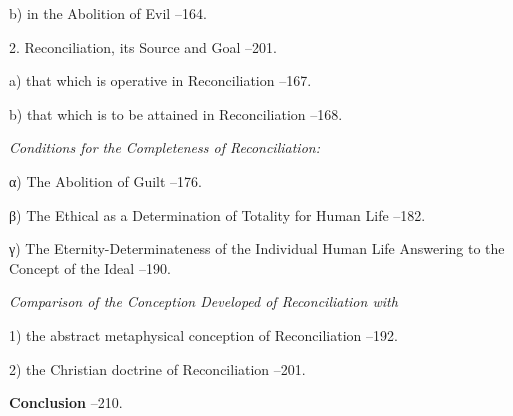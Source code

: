 \documentclass[12pt,a4paper]{book}
\begin{document}
\begin{list}{}{%
  \setlength{\leftmargin}{2.2em}\setlength{\itemindent}{-2.2em}%
  \setlength{\itemsep}{2pt}\setlength{\parsep}{0pt}}
\item[] \hspace{2.4em} b) in the Abolition of Evil --164.
\item[] \hspace{1.2em} 2. Reconciliation, its Source and Goal --201.
\item[] \hspace{2.4em} a) that which is operative in Reconciliation --167.
\item[] \hspace{2.4em} b) that which is to be attained in Reconciliation --168.
\item[] \hspace{2.4em} \emph{Conditions for the Completeness of Reconciliation:}
\item[] \hspace{2.4em} α) The Abolition of Guilt --176.
\item[] \hspace{2.4em} β) The Ethical as a Determination of Totality for
  Human Life --182.
\item[] \hspace{2.4em} γ) The Eternity-Determinateness of the Individual
  Human Life Answering to the Concept of the Ideal --190.
\item[] \hspace{1.2em} \emph{Comparison of the Conception Developed of
  Reconciliation with}
\item[] \hspace{1.2em} 1) the abstract metaphysical conception of
  Reconciliation --192.
\item[] \hspace{1.2em} 2) the Christian doctrine of Reconciliation --201.

\item \textbf{Conclusion} --210.

\end{list}
\endgroup
\end{document}
